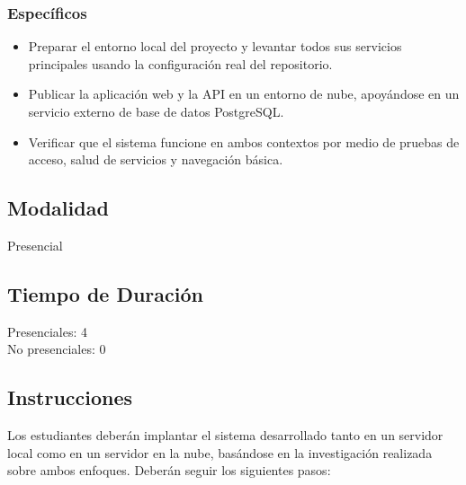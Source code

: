 \documentclass{article}
\begin{document}
\subsubsection{Específicos}
\begin{itemize}
    \item Preparar el entorno local del proyecto y levantar todos sus servicios principales usando la configuración real del repositorio.
    \item Publicar la aplicación web y la API en un entorno de nube, apoyándose en un servicio externo de base de datos PostgreSQL.
    \item Verificar que el sistema funcione en ambos contextos por medio de pruebas de acceso, salud de servicios y navegación básica.
\end{itemize}

\subsection{Modalidad}
Presencial

\subsection{Tiempo de Duración}
Presenciales: 4\\
\indent No presenciales: 0

\subsection{Instrucciones}
Los estudiantes deberán implantar el sistema desarrollado tanto en un servidor local como en un servidor en la nube, basándose en la investigación realizada sobre ambos enfoques. Deberán seguir los siguientes pasos:
\end{document}

